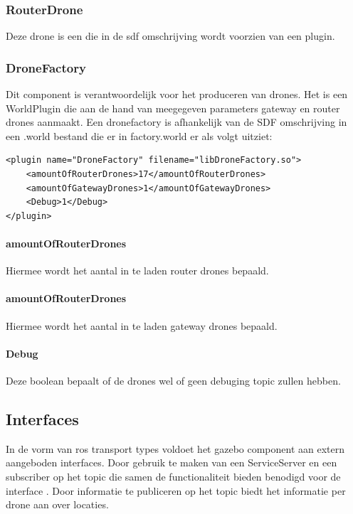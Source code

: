 \documentclass[a4paper, 11pt, oneside]{report}
\begin{document}
\subsubsection{RouterDrone}
\label{architectural:subcomponenten:RouterDrone}
Deze drone is een  die in de sdf omschrijving wordt voorzien van een  plugin. 

\subsubsection{DroneFactory}
\label{architectural:subcomponenten:DroneFactory}
Dit component is verantwoordelijk voor het produceren van drones. Het is een WorldPlugin die aan de hand van meegegeven parameters gateway en router drones aanmaakt. Een dronefactory is afhankelijk van de SDF omschrijving in een .world bestand die er in factory.world er als volgt uitziet:

\begin{lstlisting}
<plugin name="DroneFactory" filename="libDroneFactory.so">
	<amountOfRouterDrones>17</amountOfRouterDrones>
	<amountOfGatewayDrones>1</amountOfGatewayDrones>
	<Debug>1</Debug>
</plugin>
\end{lstlisting}

\paragraph{amountOfRouterDrones} Hiermee wordt het aantal in te laden router drones bepaald.
 
\paragraph{amountOfRouterDrones} Hiermee wordt het aantal in te laden gateway drones bepaald.

\paragraph{Debug} Deze boolean bepaalt of de drones wel of geen debuging topic zullen hebben.

\subsection{Interfaces}
\label{DetailedDesign:MeshNetwerk:interfaces}
In de vorm van ros transport types voldoet het gazebo component aan extern aangeboden interfaces.
Door gebruik te maken van een ServiceServer  en een subscriber op het topic  die samen de functionaliteit bieden benodigd voor de interface . 
Door informatie te publiceren op het topic  biedt het informatie per drone aan over locaties.
\end{document}
